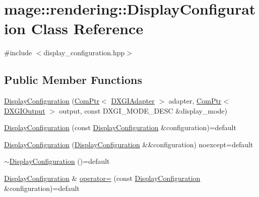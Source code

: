 \hypertarget{classmage_1_1rendering_1_1_display_configuration}{}\section{mage\+:\+:rendering\+:\+:Display\+Configuration Class Reference}
\label{classmage_1_1rendering_1_1_display_configuration}


{\ttfamily \#include $<$display\+\_\+configuration.\+hpp$>$}

\subsection*{Public Member Functions}
\begin{DoxyCompactItemize}
\item 
\mbox{\hyperlink{classmage_1_1rendering_1_1_display_configuration_ac0ee7768a59ee6a257405faaa942580b}{Display\+Configuration}} (\mbox{\hyperlink{namespacemage_ae74f374780900893caa5555d1031fd79}{Com\+Ptr}}$<$ \mbox{\hyperlink{namespacemage_1_1rendering_ad55e028ebd705b547eeb972ad8d03b6a}{D\+X\+G\+I\+Adapter}} $>$ adapter, \mbox{\hyperlink{namespacemage_ae74f374780900893caa5555d1031fd79}{Com\+Ptr}}$<$ \mbox{\hyperlink{namespacemage_1_1rendering_aaf22d3893277a4bd8497f6ea69b01532}{D\+X\+G\+I\+Output}} $>$ output, const D\+X\+G\+I\+\_\+\+M\+O\+D\+E\+\_\+\+D\+E\+SC \&display\+\_\+mode)
\item 
\mbox{\hyperlink{classmage_1_1rendering_1_1_display_configuration_a96a9331786912fce65dbeca8e3516231}{Display\+Configuration}} (const \mbox{\hyperlink{classmage_1_1rendering_1_1_display_configuration}{Display\+Configuration}} \&configuration)=default
\item 
\mbox{\hyperlink{classmage_1_1rendering_1_1_display_configuration_a9c691b88024f24fa778db90c9f1b9416}{Display\+Configuration}} (\mbox{\hyperlink{classmage_1_1rendering_1_1_display_configuration}{Display\+Configuration}} \&\&configuration) noexcept=default
\item 
\mbox{\hyperlink{classmage_1_1rendering_1_1_display_configuration_a93745480bb92a1e81e4476a897eaab6b}{$\sim$\+Display\+Configuration}} ()=default
\item 
\mbox{\hyperlink{classmage_1_1rendering_1_1_display_configuration}{Display\+Configuration}} \& \mbox{\hyperlink{classmage_1_1rendering_1_1_display_configuration_a847151bc6a61f320811e915119f38f9f}{operator=}} (const \mbox{\hyperlink{classmage_1_1rendering_1_1_display_configuration}{Display\+Configuration}} \&configuration)=default

\end{DoxyCompactItemize}
